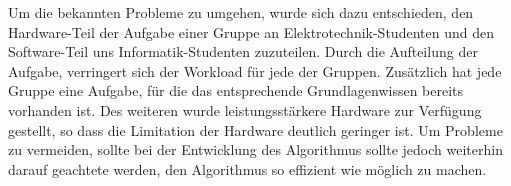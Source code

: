 Um die bekannten Probleme zu umgehen, wurde sich dazu entschieden, den Hardware-Teil der Aufgabe einer Gruppe an Elektrotechnik-Studenten und den Software-Teil uns Informatik-Studenten zuzuteilen.
Durch die Aufteilung der Aufgabe, verringert sich der Workload für jede der Gruppen.
Zusätzlich hat jede Gruppe eine Aufgabe, für die das entsprechende Grundlagenwissen bereits vorhanden ist.
Des weiteren wurde leistungsstärkere Hardware zur Verfügung gestellt, so dass die Limitation der Hardware deutlich geringer ist.
Um Probleme zu vermeiden, sollte bei der Entwicklung des Algorithmus sollte jedoch weiterhin darauf geachtete werden, den Algorithmus so effizient wie möglich zu machen.

\newpage
